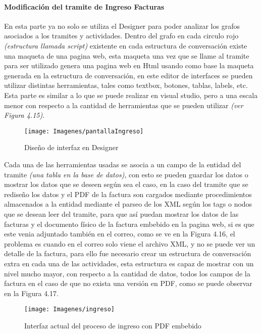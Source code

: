 		\paragraph{Modificación del tramite de Ingreso Facturas} En esta parte ya no solo se utiliza el Designer para poder analizar los grafos asociados a los tramites y actividades. Dentro del grafo en cada circulo rojo \textit{(estructura llamada script)} existente en cada estructura de conversación existe una maqueta de una pagina web, esta maqueta una vez que se llame al tramite para ser utilizado genera una pagina web en Html usando como base la maqueta generada en la estructura de conversación, en este editor de interfaces se pueden utilizar distintas herramientas, tales como textbox, botones, tablas, labels, etc. Esta parte es similar a lo que se puede realizar en visual studio, pero a una escala menor con respecto a la cantidad de herramientas que se pueden utilizar \textit{(ver Figura 4.15)}.
		
		\begin{figure}[H]
			\texttt{[image: Imagenes/pantallaIngreso]}
			\caption{Diseño de interfaz en Designer}
		\end{figure}
		
		Cada una de las herramientas usadas se asocia a un campo de la entidad del tramite \textit{(una tabla en la base de datos)}, con esto se pueden guardar los datos o mostrar los datos que se deseen según sea el caso, en la caso del tramite que se rediseño los datos y el PDF de la factura son cargados mediante procedimientos almacenados a la entidad mediante el parseo de los XML según los tags o nodos que se desean leer del tramite, para que así puedan mostrar los datos de las facturas y el documento físico de la factura embebido en la pagina web, si es que este venia adjuntado también en el correo, como se ve en la Figura 4.16, el problema es cuando en el correo solo viene el archivo XML, y no se puede ver un detalle de la factura, para ello fue necesario crear un estructura de conversación extra en cada una de las actividades, esta estructura es capaz de mostrar con un nivel mucho mayor, con respecto a la cantidad de datos, todos los campos de la factura en el caso de que no exista una versión en PDF, como se puede observar en la Figura 4.17.
		\newline
		\begin{figure}[H]
			\texttt{[image: Imagenes/ingreso]}
			\caption{Interfaz actual del proceso de ingreso con PDF embebido}
		\end{figure}
		
